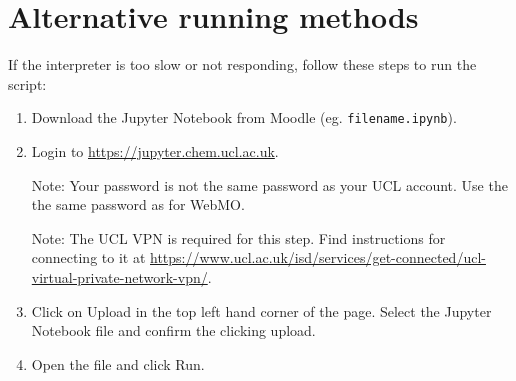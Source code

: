 \documentclass{article}
\begin{document}
\section{Alternative running methods}
If the interpreter is too slow or not responding, follow these steps to run the script:
\begin{enumerate}
\item Download the Jupyter Notebook from Moodle (eg. \texttt{filename.ipynb}).

\item Login to \href{https://jupyter.chem.ucl.ac.uk}{https://jupyter.chem.ucl.ac.uk}. 

Note: Your password is not the same password as your UCL account. Use the the same password as for WebMO.

Note: The UCL VPN is required for this step. Find instructions for connecting to it at \href{https://www.ucl.ac.uk/isd/services/get-connected/ucl-virtual-private-network-vpn/}{https://www.ucl.ac.uk/isd/services/get-connected/ucl-virtual-private-network-vpn/}.

\item Click on Upload in the top left hand corner of the page. Select the Jupyter Notebook file and confirm the clicking upload.
\item Open the file and click Run.
\end{enumerate}
\end{document}

